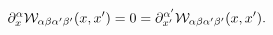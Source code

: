 \begin{equation} \partial_x^\alpha {\cal
W}_{\alpha\beta
\alpha'\beta'}(x,x')=0=\partial_{x'}^{\alpha'}
{\cal W}_{\alpha\beta \alpha'\beta'}(x,x').
\end{equation}


